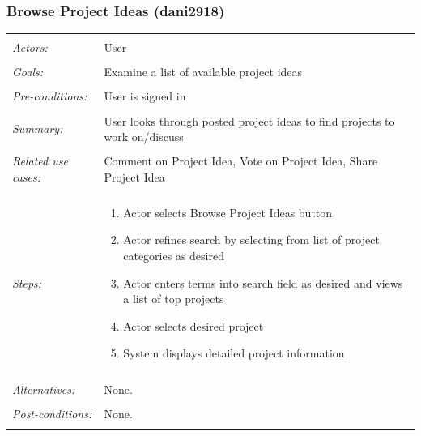\documentclass[11pt]{report}
\begin{document}
\subsubsection{Browse Project Ideas (dani2918)}
\begin{tabular}{ p{2cm} p{12cm} }
 \hline
 \\
 \textit{Actors:} & User \\ 
 \\
 \textit{Goals:} & Examine a list of available project ideas  \\
 \\
 \textit{Pre-conditions:} & User is signed in  \\
 \\
 \textit{Summary:} & User looks through posted project ideas to find projects to work on/discuss \\ 
 \\
 \textit{Related use cases:} & Comment on Project Idea, Vote on Project Idea, Share Project Idea \\ 
 \\
 \textit{Steps:} & \begin{enumerate}
  \item Actor selects Browse Project Ideas button
  \item Actor refines search by selecting from list of project categories as desired
  \item Actor enters terms into search field as desired and views a list of top projects
  \item Actor selects desired project
  \item System displays detailed project information
 \end{enumerate} \\
 \\
 \textit{Alternatives:} & None. \\
 \\
 \textit{Post-conditions:} & None. \\
 \\
\hline
\end{tabular}
\end{document}
